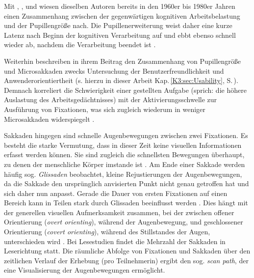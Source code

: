Mit \citet[]{hess_pupil_1964}, \citet[]{beatty_pupillary_1966}, \citet[]{kahneman_pupil_1966} und \citet[]{beatty_task-evoked_1982} wiesen dieselben Autoren bereits in den 1960er bis 1980er Jahren einen Zusammenhang zwischen der gegenwärtigen kognitiven Arbeitsbelastung und der Pupillengröße nach. Die Pupillenerweiterung weist daher eine kurze Latenz nach Beginn der kognitiven Verarbeitung auf und ebbt ebenso schnell wieder ab, nachdem die Verarbeitung beendet ist  \citep[276]{beatty_task-evoked_1982}.

Weiterhin beschreiben \citeauthor{krejtz_eye_2018} in ihrem Beitrag den Zusammenhang von Pupillengröße und Microsakkaden zwecks Untersuchung der Benutzerfreundlichkeit und Anwenderorientiertheit (s. hierzu in dieser Arbeit Kap.\,\ref{K3:sec:Usability}, S.\,\pageref{K3:sec:Usability}). Demnach korreliert die Schwierigkeit einer gestellten Aufgabe (sprich: die höhere Auslastung des Arbeitsgedächtnisses) mit der Aktivierungsschwelle zur Ausführung von Fixationen, was sich zugleich wiederum in weniger Microsakkaden widerspiegelt \citep[17\psqq]{krejtz_eye_2018}.

Sakkaden hingegen sind schnelle Augenbewegungen zwischen zwei Fixationen. Es besteht die starke Vermutung, dass in dieser Zeit keine visuellen Informationen erfasst werden können. Sie sind zugleich die schnellsten Bewegungen überhaupt, zu denen der menschliche Körper imstande ist \citep[23]{holmqvist_eye_2011}. Am Ende einer Sakkade werden häufig sog. \emph{Glissaden} beobachtet, kleine Rejustierungen der Augenbewegungen, da die Sakkade den ursprünglich anvisierten Punkt nicht genau getroffen hat und sich daher nun anpasst. Gerade die Dauer von ersten Fixationen auf einen Bereich kann in Teilen stark durch Glissaden beeinflusst werden \citep[165]{holmqvist_eye_2011}. Dies hängt mit der generellen visuellen Aufmerksamkeit zusammen, bei der zwischen offener Orientierung (\emph{overt orienting}), während der Augenbewegung, und geschlossener Orientierung (\emph{covert orienting}), während des Stillstandes der Augen, unterschieden wird \citep[152]{le_meur_saccadic_2015}. Bei Lesestudien findet die Mehrzahl der Sakkaden in Leserichtung statt. Die räumliche Abfolge von Fixationen und Sakkaden über den zeitlichen Verlauf der Erhebung (pro Teilnehmer{\textperiodcentered}in) ergibt den sog. \emph{scan path}, der eine Visualisierung der Augenbewegungen ermöglicht.



